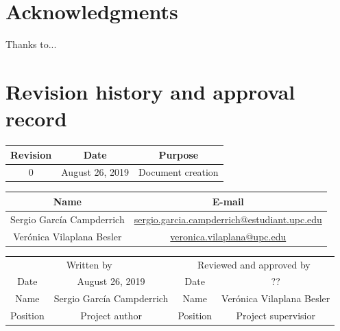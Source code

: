 \documentclass[a4paper,12pt,titlepage]{article}
\begin{document}
\section*{Acknowledgments}
Thanks to...
\thispagestyle{empty}

\section*{Revision history and approval record}
\begin{center}
\begin{tabular}{*3c}
\toprule
Revision & Date & Purpose \\
\midrule
0 & August 26, 2019 & Document creation \\
\bottomrule
\end{tabular}
\end{center}

\begin{center}
\begin{tabular}{*2c}
\toprule
Name & E-mail \\
\midrule
Sergio García Campderrich & \url{sergio.garcia.campderrich@estudiant.upc.edu} \\
Verónica Vilaplana Besler & \url{veronica.vilaplana@upc.edu} \\
\bottomrule
\end{tabular}
\end{center}

\begin{center}
\begin{tabular}{*4c}
\toprule
\multicolumn{2}{c}{Written by} & \multicolumn{2}{c}{Reviewed and approved by}\\
Date & August 26, 2019 & Date & ?? \\
\midrule
Name & Sergio García Campderrich & Name & Verónica Vilaplana Besler \\
Position & Project author & Position & Project supervisior \\
\bottomrule
\end{tabular}
\end{center}

\thispagestyle{empty}

\tableofcontents
\thispagestyle{empty}

\listoffigures
\thispagestyle{empty}

\listoftables
\thispagestyle{empty}

\printglossary[type=\acronymtype,title=Acronyms]
\thispagestyle{empty}
\end{document}
